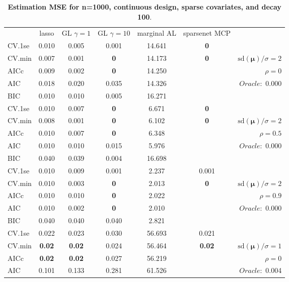 \clearpage
\begin{table}\vspace{-.5cm}
\caption[l]{ { \bf Estimation MSE for n=1000, continuous design, 
sparse covariates, and  decay  100}.}
\vspace{-.5cm}
\footnotesize{}
\begin{center}
\begin{tabular}{l*{5}{c}|r}
& lasso & GL $\gamma=1$ & GL $\gamma=10$ & marginal AL & sparsenet MCP  & \\
 \cline{1-7}
CV.1se & 0.010 & 0.005 & 0.001 & 14.641 & {\bf 0} & \\
CV.min & 0.007 & 0.001 & {\bf 0} & 14.173 & {\bf 0} &  $\mathrm{sd}(\mathbf{\mu})/\sigma=2$ \\
AICc & 0.009 & 0.002 & {\bf 0} & 14.250 & & $\rho=0$ \\
AIC & 0.018 & 0.020 & 0.035 & 14.326 & &  \multirow{2}{*}{$Oracle: $ 0.000} \\
BIC & 0.010 & 0.010 & 0.005 & 16.271 & &  \\
 \hline 
CV.1se & 0.010 & 0.007 & {\bf 0} & 6.671 & {\bf 0} & \\
CV.min & 0.008 & 0.001 & {\bf 0} & 6.102 & {\bf 0} &  $\mathrm{sd}(\mathbf{\mu})/\sigma=2$ \\
AICc & 0.010 & 0.007 & {\bf 0} & 6.348 & & $\rho=0.5$ \\
AIC & 0.010 & 0.010 & 0.015 & 5.976 & &  \multirow{2}{*}{$Oracle: $ 0.000} \\
BIC & 0.040 & 0.039 & 0.004 & 16.698 & &  \\
 \hline 
CV.1se & 0.010 & 0.009 & 0.001 & 2.237 & 0.001 & \\
CV.min & 0.010 & 0.003 & {\bf 0} & 2.013 & {\bf 0} &  $\mathrm{sd}(\mathbf{\mu})/\sigma=2$ \\
AICc & 0.010 & 0.010 & {\bf 0} & 2.022 & & $\rho=0.9$ \\
AIC & 0.010 & 0.002 & {\bf 0} & 2.010 & &  \multirow{2}{*}{$Oracle: $ 0.000} \\
BIC & 0.040 & 0.040 & 0.040 & 2.821 & &  \\
 \hline 
CV.1se & 0.022 & 0.023 & 0.030 & 56.693 & 0.021 & \\
CV.min & {\bf 0.02} & {\bf 0.02} & 0.024 & 56.464 & {\bf 0.02} &  $\mathrm{sd}(\mathbf{\mu})/\sigma=1$ \\
AICc & {\bf 0.02} & {\bf 0.02} & 0.027 & 56.219 & & $\rho=0$ \\
AIC & 0.101 & 0.133 & 0.281 & 61.526 & &  \multirow{2}{*}{$Oracle: $ 0.004} \\

\end{tabular}
\end{center}
\end{table}
